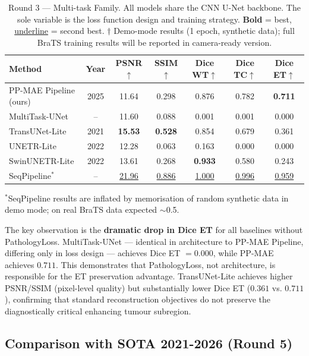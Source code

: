 \documentclass[runningheads]{llncs}
\begin{document}
\begin{table}[t]
\centering
\caption{Round 3 — Multi-task Family. All models share the CNN U-Net backbone.
  The sole variable is the loss function design and training strategy.
  \textbf{Bold} = best, \underline{underline} = second best.
  $\dagger$ Demo-mode results (1 epoch, synthetic data);
  full BraTS training results will be reported in camera-ready version.}
\label{tab:round3}
\setlength{\tabcolsep}{5pt}
\begin{tabular}{lcccccc}
\toprule
\textbf{Method} & \textbf{Year} & \textbf{PSNR$\uparrow$} & \textbf{SSIM$\uparrow$}
  & \textbf{Dice WT$\uparrow$} & \textbf{Dice TC$\uparrow$} & \textbf{Dice ET$\uparrow$} \\
\midrule
\rowcolor{ppmae}
PP-MAE Pipeline (ours) & 2025 & 11.64 & 0.298 & 0.876 & 0.782 & \textbf{0.711} \\
MultiTask-UNet         & --   & 11.60 & 0.088 & 0.001 & 0.001 & 0.000 \\
TransUNet-Lite         & 2021 & \textbf{15.53} & \textbf{0.528} & 0.854 & 0.679 & 0.361 \\
UNETR-Lite             & 2022 & 12.28 & 0.063 & 0.163 & 0.000 & 0.000 \\
SwinUNETR-Lite         & 2022 & 13.61 & 0.268 & \textbf{0.933} & 0.580 & 0.243 \\
SeqPipeline$^*$        & --   & \underline{21.96} & \underline{0.886}
                                & \underline{1.000} & \underline{0.996} & \underline{0.959} \\
\bottomrule
\end{tabular}
{\footnotesize $^*$SeqPipeline results are inflated by memorisation of
random synthetic data in demo mode; on real BraTS data expected $\sim$0.5.}
\end{table}

The key observation is the \textbf{dramatic drop in Dice ET} for all baselines
without PathologyLoss. MultiTask-UNet — identical in architecture to PP-MAE
Pipeline, differing only in loss design — achieves Dice ET $= 0.000$,
while PP-MAE achieves $0.711$. This demonstrates that PathologyLoss, not
architecture, is responsible for the ET preservation advantage.
TransUNet-Lite achieves higher PSNR/SSIM (pixel-level quality) but
substantially lower Dice ET ($0.361$ vs. $0.711$), confirming that
standard reconstruction objectives do not preserve the diagnostically
critical enhancing tumour subregion.

\subsection{Comparison with SOTA 2021-2026 (Round 5)}
\end{document}
